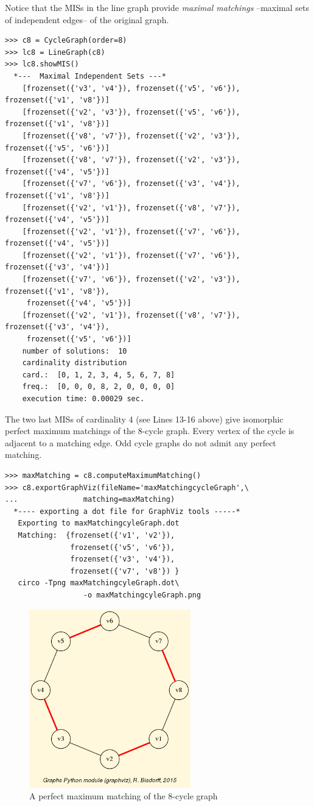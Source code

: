 Notice that the MISs in the line graph provide \emph{maximal matchings} --maximal sets of independent edges-- of the original graph.
\begin{lstlisting}[basicstyle=\scriptsize]
>>> c8 = CycleGraph(order=8)
>>> lc8 = LineGraph(c8)
>>> lc8.showMIS()
  *---  Maximal Independent Sets ---*
    [frozenset({'v3', 'v4'}), frozenset({'v5', 'v6'}), frozenset({'v1', 'v8'})]
    [frozenset({'v2', 'v3'}), frozenset({'v5', 'v6'}), frozenset({'v1', 'v8'})]
    [frozenset({'v8', 'v7'}), frozenset({'v2', 'v3'}), frozenset({'v5', 'v6'})]
    [frozenset({'v8', 'v7'}), frozenset({'v2', 'v3'}), frozenset({'v4', 'v5'})]
    [frozenset({'v7', 'v6'}), frozenset({'v3', 'v4'}), frozenset({'v1', 'v8'})]
    [frozenset({'v2', 'v1'}), frozenset({'v8', 'v7'}), frozenset({'v4', 'v5'})]
    [frozenset({'v2', 'v1'}), frozenset({'v7', 'v6'}), frozenset({'v4', 'v5'})]
    [frozenset({'v2', 'v1'}), frozenset({'v7', 'v6'}), frozenset({'v3', 'v4'})]
    [frozenset({'v7', 'v6'}), frozenset({'v2', 'v3'}), frozenset({'v1', 'v8'}),
     frozenset({'v4', 'v5'})]
    [frozenset({'v2', 'v1'}), frozenset({'v8', 'v7'}), frozenset({'v3', 'v4'}),
     frozenset({'v5', 'v6'})]
    number of solutions:  10
    cardinality distribution
    card.:  [0, 1, 2, 3, 4, 5, 6, 7, 8]
    freq.:  [0, 0, 0, 8, 2, 0, 0, 0, 0]
    execution time: 0.00029 sec.
\end{lstlisting}
The two last MISs of cardinality 4 (see Lines 13-16 above) give isomorphic perfect maximum matchings of the 8-cycle graph. Every vertex of the cycle is adjacent to a matching edge. Odd cycle graphs do not admit any perfect matching.
\begin{lstlisting}
>>> maxMatching = c8.computeMaximumMatching()
>>> c8.exportGraphViz(fileName='maxMatchingcycleGraph',\
...   		      matching=maxMatching)
  *---- exporting a dot file for GraphViz tools -----*
   Exporting to maxMatchingcyleGraph.dot
   Matching:  {frozenset({'v1', 'v2'}),
               frozenset({'v5', 'v6'}),
               frozenset({'v3', 'v4'}),
               frozenset({'v7', 'v8'}) }
   circo -Tpng maxMatchingcyleGraph.dot\
                  -o maxMatchingcyleGraph.png
\end{lstlisting}
\begin{figure}[h]
\sidecaption
\includegraphics[width=7cm]{Figures/maxMatchingcycleGraph.png}
\caption{A perfect maximum matching of the 8-cycle graph} 
\label{fig:22.4}       %
\end{figure}
	    
